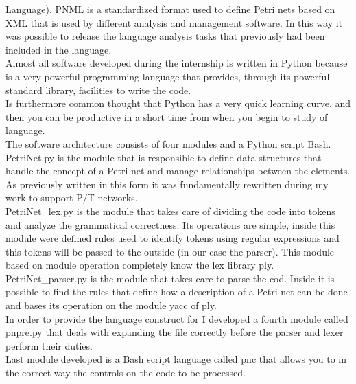 \documentclass[english,12pt]{report}
\begin{document}
Language). PNML is a standardized format used to define Petri nets based on XML that is used by 
different analysis and management software. In this way it was possible to release the language
analysis tasks that previously had been included in the language. \\
Almost all software developed during the internship is written in Python because is a very powerful 
programming language that provides, through its powerful standard library, facilities to write the 
code. \\
Is furthermore common thought that Python has a very quick learning curve, and then you can be 
productive in a short time from when you begin to study of language. \\
The software architecture consists of four modules and a Python script Bash. \\
PetriNet.py is the module that is responsible to define data structures that handle the concept 
of a Petri net and manage relationships between the elements. As previously written in this form it 
was fundamentally rewritten during my work to support P/T networks. \\
PetriNet\_lex.py is the module that takes care of dividing the code into tokens and analyze the 
grammatical correctness. 
Its operations are simple, inside this module were defined rules used to identify tokens using regular 
expressions and this tokens will be passed to the outside (in our case the parser). This module 
based on module operation completely know the lex library ply. \\
PetriNet\_parser.py is the module that takes care to parse the cod. Inside it is possible to find the 
rules that define how a description of a Petri net can be done and bases its operation on the 
module yacc of ply. \\
In order to provide the language construct for I developed a fourth module called pnpre.py that deals 
with expanding the file correctly before the parser and lexer perform their duties. \\
Last module developed is a Bash script language called pnc that allows you to in the correct way the 
controls on the code to be processed.
\end{document}
